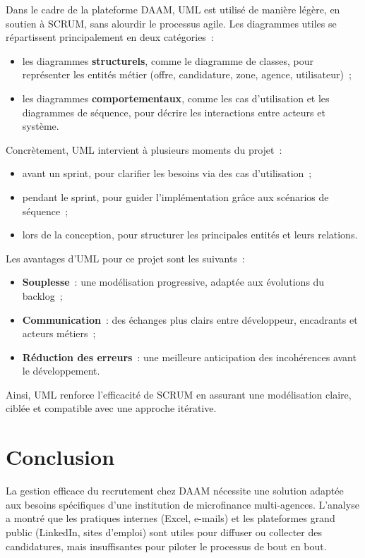 Dans le cadre de la plateforme DAAM, UML est utilisé de manière légère, en
soutien à SCRUM, sans alourdir le processus agile. Les diagrammes utiles se
répartissent principalement en deux catégories~:
\begin{itemize}
  \item les diagrammes \textbf{structurels}, comme le diagramme de classes,
        pour représenter les entités métier (offre, candidature, zone, agence,
        utilisateur)~;
  \item les diagrammes \textbf{comportementaux}, comme les cas d'utilisation
        et les diagrammes de séquence, pour décrire les interactions entre
        acteurs et système.
\end{itemize}

Concrètement, UML intervient à plusieurs moments du projet~:
\begin{itemize}
  \item avant un sprint, pour clarifier les besoins via des cas d'utilisation~;
  \item pendant le sprint, pour guider l'implémentation grâce aux scénarios
        de séquence~;
  \item lors de la conception, pour structurer les principales entités et leurs
        relations.
\end{itemize}

Les avantages d'UML pour ce projet sont les suivants~:
\begin{itemize}
  \item \textbf{Souplesse}~: une modélisation progressive, adaptée aux
        évolutions du backlog~;
  \item \textbf{Communication}~: des échanges plus clairs entre développeur,
        encadrants et acteurs métiers~;
  \item \textbf{Réduction des erreurs}~: une meilleure anticipation des
        incohérences avant le développement.
\end{itemize}

Ainsi, UML renforce l'efficacité de SCRUM en assurant une modélisation claire,
ciblée et compatible avec une approche itérative.


\section{Conclusion}

La gestion efficace du recrutement chez DAAM nécessite une solution adaptée aux
besoins spécifiques d'une institution de microfinance multi-agences. L'analyse
a montré que les pratiques internes (Excel, e-mails) et les plateformes grand
public (LinkedIn, sites d'emploi) sont utiles pour diffuser ou collecter des
candidatures, mais insuffisantes pour piloter le processus de bout en bout.

